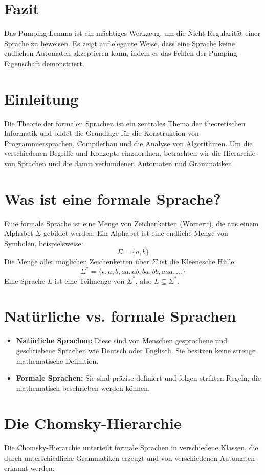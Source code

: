 \documentclass{article}
\begin{document}
	\section{Fazit}
	Das Pumping-Lemma ist ein mächtiges Werkzeug, um die Nicht-Regularität einer Sprache zu beweisen. Es zeigt auf elegante Weise, dass eine Sprache keine endlichen Automaten akzeptieren kann, indem es das Fehlen der Pumping-Eigenschaft demonstriert.
	
	\section{Einleitung}
	Die Theorie der formalen Sprachen ist ein zentrales Thema der theoretischen Informatik und bildet die Grundlage für die Konstruktion von Programmiersprachen, Compilerbau und die Analyse von Algorithmen. Um die verschiedenen Begriffe und Konzepte einzuordnen, betrachten wir die Hierarchie von Sprachen und die damit verbundenen Automaten und Grammatiken.
	
	\section{Was ist eine formale Sprache?}
	Eine formale Sprache ist eine Menge von Zeichenketten (Wörtern), die aus einem Alphabet $\Sigma$ gebildet werden. Ein Alphabet ist eine endliche Menge von Symbolen, beispielsweise:
	\[ \Sigma = \{a, b\} \]
	Die Menge aller möglichen Zeichenketten über $\Sigma$ ist die Kleenesche Hülle:
	\[ \Sigma^* = \{\epsilon, a, b, aa, ab, ba, bb, aaa, \dots\} \]
	Eine Sprache $L$ ist eine Teilmenge von $\Sigma^*$, also $L \subseteq \Sigma^*$.
	
	\section{Natürliche vs. formale Sprachen}
	\begin{itemize}
		\item \textbf{Natürliche Sprachen:} Diese sind von Menschen gesprochene und geschriebene Sprachen wie Deutsch oder Englisch. Sie besitzen keine strenge mathematische Definition.
		\item \textbf{Formale Sprachen:} Sie sind präzise definiert und folgen strikten Regeln, die mathematisch beschrieben werden können.
	\end{itemize}
	
	\section{Die Chomsky-Hierarchie}
	Die Chomsky-Hierarchie unterteilt formale Sprachen in verschiedene Klassen, die durch unterschiedliche Grammatiken erzeugt und von verschiedenen Automaten erkannt werden:
	
\end{document}
